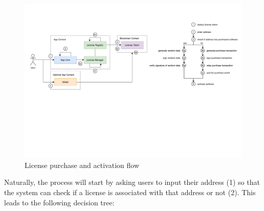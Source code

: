 \documentclass{egpubl}
\begin{document}
\begin{figure}[h]
	\centering
	\setlength{\fboxsep}{1pt}
   	\setlength{\fboxrule}{1pt}	
	\includegraphics[width=1\linewidth]{images/flow_chart.pdf}
	\caption{License purchase and activation flow}
	\label{img:flowChart}
\end{figure}

\FloatBarrier

Naturally, the process will start by asking users to input their address (1) so that the system can check if a license is associated with that address or not (2). This leads to the following decision tree:
\end{document}
